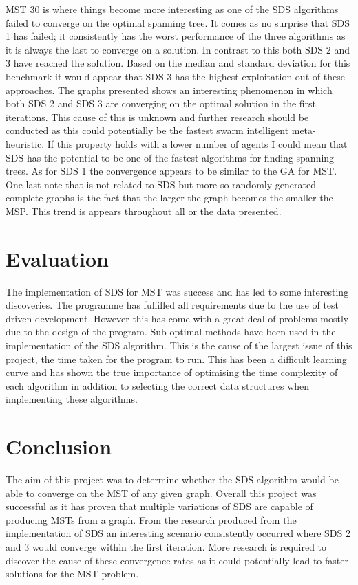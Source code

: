 \documentclass{AISB2008}
\begin{document}
{MST 30 is where things become more interesting as one of the SDS algorithms failed to converge on the optimal spanning tree. It comes as no surprise that SDS 1 has failed; it consistently has the worst performance of the three algorithms as it is always the last to converge on a solution. In contrast to this both SDS 2 and 3 have reached the solution. Based on the median and standard deviation for this benchmark it would appear that SDS 3 has the highest exploitation out of these approaches. 
The graphs presented shows an interesting phenomenon in which both SDS 2 and SDS 3 are converging on the optimal solution in the first iterations. This cause of this is unknown and further research should be conducted as this could potentially be the fastest swarm intelligent meta-heuristic. If this property holds with a lower number of agents I could mean that SDS has the potential to be one of the fastest algorithms for finding spanning trees. As for SDS 1 the convergence appears to be similar to the GA for MST.
One last note that is not related to SDS but more so randomly generated complete graphs is the fact that the larger the graph becomes the smaller the MSP. This trend is appears throughout all or the data presented. 



\section{Evaluation}

The implementation of SDS for MST was success and has led to some interesting discoveries. The programme has fulfilled all requirements due to the use of test driven development. However this has come with a great deal of problems mostly due to the design of the program. Sub optimal methods have been used in the implementation of the SDS algorithm. This is the cause of the largest issue of this project, the time taken for the program to run. This has been a difficult learning curve and has shown the true importance of optimising the time complexity of each algorithm in addition to selecting the correct data structures when implementing these algorithms.


\section{Conclusion}

The aim of this project was to determine whether the SDS algorithm would be able to converge on the MST of any given graph. Overall this project was successful as it has proven that multiple variations of SDS are capable of producing MSTs from a graph. From the research produced from the implementation of SDS an interesting scenario consistently occurred where SDS 2 and 3 would converge within the first iteration. More research is required to discover the cause of these convergence rates as it could potentially lead to faster solutions for the MST problem.


}
\end{document}
